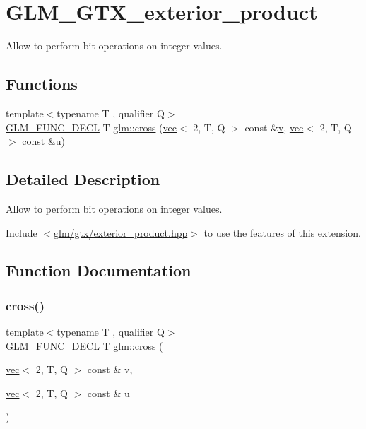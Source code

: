 \hypertarget{group__gtx__exterior__product}{}\section{G\+L\+M\+\_\+\+G\+T\+X\+\_\+exterior\+\_\+product}
\label{group__gtx__exterior__product}


Allow to perform bit operations on integer values.  


\subsection*{Functions}
\begin{DoxyCompactItemize}
\item 
{\footnotesize template$<$typename T , qualifier Q$>$ }\\\mbox{\hyperlink{setup_8hpp_ab2d052de21a70539923e9bcbf6e83a51}{G\+L\+M\+\_\+\+F\+U\+N\+C\+\_\+\+D\+E\+CL}} T \mbox{\hyperlink{group__gtx__exterior__product_gac36e72b934ea6a9dd313772d7e78fa93}{glm\+::cross}} (\mbox{\hyperlink{structglm_1_1vec}{vec}}$<$ 2, T, Q $>$ const \&\mbox{\hyperlink{_s_d_l__opengl_8h_a10a82eabcb59d2fcd74acee063775f90}{v}}, \mbox{\hyperlink{structglm_1_1vec}{vec}}$<$ 2, T, Q $>$ const \&u)
\end{DoxyCompactItemize}


\subsection{Detailed Description}
Allow to perform bit operations on integer values. 

Include $<$\mbox{\hyperlink{exterior__product_8hpp}{glm/gtx/exterior\+\_\+product.\+hpp}}$>$ to use the features of this extension. 

\subsection{Function Documentation}
\mbox{\label{group__gtx__exterior__product_gac36e72b934ea6a9dd313772d7e78fa93}} 
\subsubsection{\texorpdfstring{cross()}{cross()}}
{\footnotesize\ttfamily template$<$typename T , qualifier Q$>$ \\
\mbox{\hyperlink{setup_8hpp_ab2d052de21a70539923e9bcbf6e83a51}{G\+L\+M\+\_\+\+F\+U\+N\+C\+\_\+\+D\+E\+CL}} T glm\+::cross (\begin{DoxyParamCaption}\item[{\mbox{\hyperlink{structglm_1_1vec}{vec}}$<$ 2, T, Q $>$ const \&}]{v,  }\item[{\mbox{\hyperlink{structglm_1_1vec}{vec}}$<$ 2, T, Q $>$ const \&}]{u }\end{DoxyParamCaption})}

